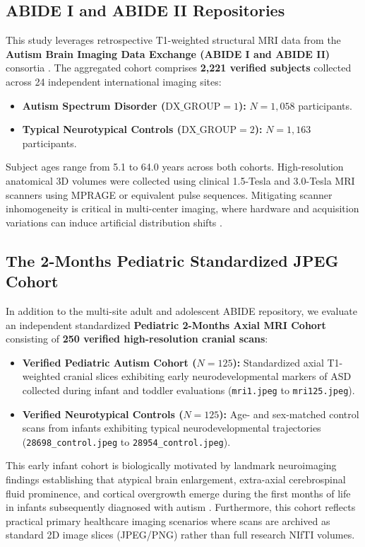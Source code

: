 \documentclass[conference]{IEEEtran}
\begin{document}
\subsection{ABIDE I and ABIDE II Repositories}
This study leverages retrospective T1-weighted structural MRI data from the \textbf{Autism Brain Imaging Data Exchange (ABIDE I and ABIDE II)} consortia \cite{dimartino2014autism, dimartino2017abide2}. The aggregated cohort comprises \textbf{2,221 verified subjects} collected across 24 independent international imaging sites:
\begin{itemize}
    \item \textbf{Autism Spectrum Disorder ($\text{DX\_GROUP} = 1$):} $N = 1,058$ participants.
    \item \textbf{Typical Neurotypical Controls ($\text{DX\_GROUP} = 2$):} $N = 1,163$ participants.
\end{itemize}
Subject ages range from 5.1 to 64.0 years across both cohorts. High-resolution anatomical 3D volumes were collected using clinical 1.5-Tesla and 3.0-Tesla MRI scanners using MPRAGE or equivalent pulse sequences. Mitigating scanner inhomogeneity is critical in multi-center imaging, where hardware and acquisition variations can induce artificial distribution shifts \cite{nielsen2013multisite, abraham2017deriving, fortin2018harmonization}.

\subsection{The 2-Months Pediatric Standardized JPEG Cohort}
In addition to the multi-site adult and adolescent ABIDE repository, we evaluate an independent standardized \textbf{Pediatric 2-Months Axial MRI Cohort} consisting of \textbf{250 verified high-resolution cranial scans}:
\begin{itemize}
    \item \textbf{Verified Pediatric Autism Cohort ($N = 125$):} Standardized axial T1-weighted cranial slices exhibiting early neurodevelopmental markers of ASD collected during infant and toddler evaluations (\texttt{mri1.jpeg} to \texttt{mri125.jpeg}).
    \item \textbf{Verified Neurotypical Controls ($N = 125$):} Age- and sex-matched control scans from infants exhibiting typical neurodevelopmental trajectories (\texttt{28698\_control.jpeg} to \texttt{28954\_control.jpeg}).
\end{itemize}
This early infant cohort is biologically motivated by landmark neuroimaging findings establishing that atypical brain enlargement, extra-axial cerebrospinal fluid prominence, and cortical overgrowth emerge during the first months of life in infants subsequently diagnosed with autism \cite{courchesne2001unusual, shen2013early, hazlett2017early}. Furthermore, this cohort reflects practical primary healthcare imaging scenarios where scans are archived as standard 2D image slices (JPEG/PNG) rather than full research NIfTI volumes.
\end{document}
